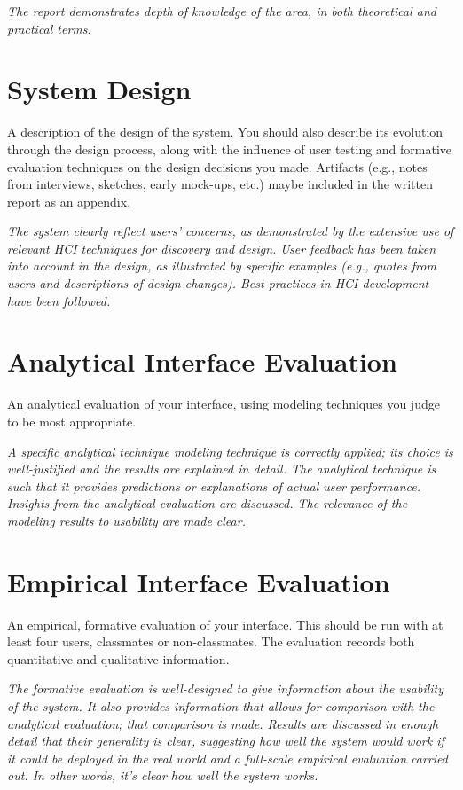 \documentclass[conference]{IEEEtran}
\begin{document}
\emph{The report demonstrates depth of knowledge of the area, in both theoretical and practical terms.}

\section{System Design}
A description of the design of the system. You should also describe its evolution through the design process, along with the influence of user testing and formative evaluation techniques on the design decisions you made. Artifacts (e.g., notes from interviews, sketches, early mock-ups, etc.) maybe included in the written report as an appendix. 

\emph{The system clearly reflect users' concerns, as demonstrated by the extensive use of relevant HCI techniques for discovery and design. User feedback has been taken into account in the design, as illustrated by specific examples (e.g., quotes from users and descriptions of design changes). Best practices in HCI development have been followed.}


\section{Analytical Interface Evaluation}
 An analytical evaluation of your interface, using modeling techniques you judge to be most appropriate. 
 
\emph{A specific analytical technique modeling technique is correctly applied; its choice is well-justified and the results are explained in detail. The analytical technique is such that it provides predictions or explanations of actual user performance. Insights from the analytical evaluation are discussed. The relevance of the modeling results to usability are made clear.}

\section{Empirical Interface Evaluation}
An empirical, formative evaluation of your interface. This should be run with at least four users, classmates or non-classmates. The evaluation records both quantitative and qualitative information. 

\emph{The formative evaluation is well-designed to give information about the usability of the system. It also provides information that allows for comparison with the analytical evaluation; that comparison is made. Results are discussed in enough detail that their generality is clear, suggesting how well the system would work if it could be deployed in the real world and a full-scale empirical evaluation carried out. In other words, it's clear how well the system works.}
\end{document}

